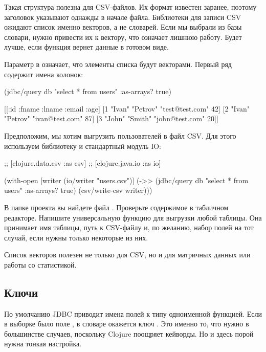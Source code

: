 Такая структура полезна для CSV-файлов. Их формат известен заранее, поэтому заголовок указывают однажды в начале файла. Библиотеки для записи CSV ожидают список именно векторов, а не словарей. Если мы выбрали из базы словари, нужно привести их к вектору, что означает лишнюю работу. Будет лучше, если функция  вернет данные в готовом виде.

Параметр  в  означает, что элементы списка будут векторами. Первый ряд содержит имена колонок:

\begin{english}
  \begin{clojure}
(jdbc/query db "select * from users" {:as-arrays? true})

[[:id :fname :lname :email :age]
 [1 "Ivan" "Petrov" "test@test.com" 42]
 [2 "Ivan" "Petrov" "ivan@test.com" 87]
 [3 "John" "Smith" "john@test.com" 20]]
  \end{clojure}
\end{english}

Предположим, мы хотим выгрузить пользователей в файл CSV. Для этого используем библиотеку  и стандартный модуль IO:

\begin{english}
  \begin{clojure}
;; [clojure.data.csv :as csv]
;; [clojure.java.io :as io]

(with-open [writer (io/writer "users.csv")]
  (->> (jdbc/query db "select * from users" {:as-arrays? true})
       (csv/write-csv writer)))
  \end{clojure}
\end{english}

В папке проекта вы найдете файл . Проверьте содержимое в табличном редакторе. Напишите универсальную функцию для выгрузки любой таблицы. Она принимает имя таблицы, путь к CSV-файлу и, по желанию, набор полей на тот случай, если нужны только некоторые из них.

Список векторов полезен не только для CSV, но и для матричных данных или работы со статистикой.


\subsection{Ключи}

По умолчанию JDBC приводит имена полей к типу  одноименной функцией. Если в выборке было поле , в словаре окажется ключ . Это именно то, что нужно в большинстве случаев, поскольку Clojure поощряет кейворды. Но и здесь порой нужна тонкая настройка.

